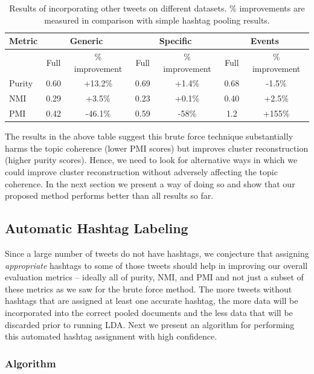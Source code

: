 \documentclass[10pt,a5paper,twoside]{article}
\begin{document}
\begin{table}[!h]
\centering
\resizebox{14cm}{!} 
{
	\begin{tabular}{|l|cc|cc|cc|}
	\hline
	Metric  & \multicolumn {2}{c}{Generic} & \multicolumn {2}{c}{Specific} & \multicolumn {2}{c|}{Events}\\
	\hline
	 & Full & \% improvement & Full & \% improvement & Full & \% improvement\\
	\hline
	Purity & 0.60 & +13.2\% & 0.69 & +1.4\% & 0.68 & -1.5\% \\
	\hline
	NMI & 0.29 & +3.5\% & 0.23 & +0.1\% & 0.40 & +2.5\% \\
	\hline
	PMI & 0.42 & -46.1\% & 0.59 & -58\% & 1.2 & +155\% \\
	\hline
	\end{tabular}
}
\caption{Results of incorporating other tweets on different datasets. \% improvements are measured in comparison with simple hashtag pooling results.}\label{tbl-8}
\end{table}

The results in the above table suggest this brute force technique
substantially harms the topic coherence (lower PMI scores) but
improves cluster reconstruction (higher purity scores).  Hence, we
need to look for alternative ways in which we could improve cluster
reconstruction without adversely affecting the topic coherence. In the
next section we present a way of doing so and show that our proposed
method performs better than all results so far.

\subsection{Automatic Hashtag Labeling}

\label{subsec:assign_hashtags}

Since a large number of tweets do not have hashtags, we conjecture
that assigning \emph{appropriate} hashtags to some of those tweets
should help in improving our overall evaluation metrics -- ideally all
of purity, NMI, and PMI and not just a subset of these metrics as we
saw for the brute force method.  The more tweets without hashtags that
are assigned at least one accurate hashtag, the more data will be
incorporated into the correct pooled documents and the less data that
will be discarded prior to running LDA.  Next we present an algorithm
for performing this automated hashtag assignment with high confidence.

\subsubsection{Algorithm}
\end{document}
